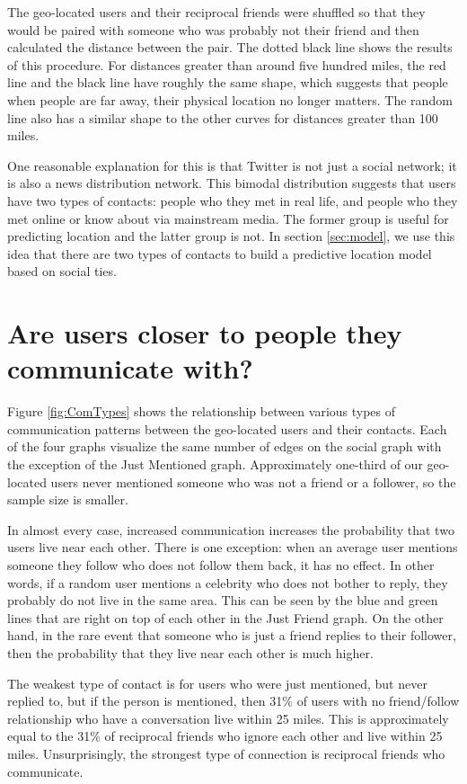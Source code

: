 The geo-located users and their reciprocal friends were shuffled so that they
would be paired with someone who was probably not their friend and then
calculated the distance between the pair.
The dotted black line shows the results of this procedure.
For distances greater than around five
hundred miles, the red line and the black line have roughly the same shape,
which suggests that people when people are far away, their physical location no
longer matters.
The random line also has a similar shape to the other curves for distances
greater than 100 miles.

One reasonable explanation for this is that Twitter is not just a social
network; it is also a news distribution network.  This bimodal distribution
suggests that users have two types of contacts: people who they met in
real life, and people who they met online or know about via mainstream media.
The former group is useful for predicting location and the latter group is not.
In section \ref{sec:model}, we use this idea that there are two types of
contacts to build a predictive location model based on social ties.


\section{Are users closer to people they communicate with?}

Figure \ref{fig:ComTypes} shows the relationship between various types of
communication patterns between the geo-located users and their contacts.
Each of the four graphs visualize the same number of edges on the social graph
with the exception of the Just Mentioned graph. Approximately one-third of our
geo-located users never mentioned someone who was not a friend or a follower,
so the sample size is smaller.

In almost every case, increased communication increases the probability that
two users live near each other.
There is one exception: when an average user mentions someone they follow who
does not follow them back, it has no effect.
In other words, if a random user mentions a celebrity who does not bother to reply, they probably do not live in the same area. This can be seen by the blue and green lines that are right on top of each other in the Just Friend graph.
On the other hand, in the rare event that someone who is just a friend replies
to their follower, then the probability that they live near each other is much higher.

The weakest type of contact is for users who were just mentioned, but never
replied to, but if the person is mentioned, then 31\% of users with no
friend/follow relationship who have a conversation live within 25 miles.
This is approximately equal to the 31\% of reciprocal friends who ignore each
other and live within 25 miles.
Unsurprisingly, the strongest type of connection is reciprocal friends who communicate.


